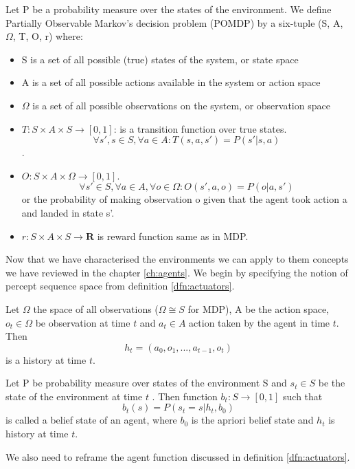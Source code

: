\begin{defn}
Let P be a probability measure over the states of the environment.	
We define Partially Observable Markov’s decision problem (POMDP) by a six-tuple (S, A, $\Omega$, T, O, r) where:
\begin{itemize}
	\item S is a set of all possible (true) states of the system, or state space
	\item A is a set of all possible actions available in the system or action space
	\item $\Omega$ is a set of all possible observations on the system, or observation space
	\item $T: S\times A\times S \rightarrow [0, 1]$: is a transition function over true states. 
	$$\forall s',s \in S, \forall a\in A: T(s, a,  s')=P(s'|s,a)$$.
	
	\item $ O: S\times A \times \Omega \rightarrow [0, 1]$. $$\forall s' \in S, \forall a\in A, \forall o\in\Omega: O(s', a,  o)=P(o|a, s')$$ or the probability of making observation o given that the agent took action a and landed in state s’. 
	\item $ r: S\times A\times S \rightarrow \boldsymbol{R} $ is reward function same as in MDP.
\end{itemize}
\end{defn}
Now that we have characterised the environments we can apply to them concepts we have reviewed in the chapter \ref{ch:agents}. We begin by specifying the notion of percept sequence space from definition \ref{dfn:actuators}.
\begin{defn}
	Let $ \Omega $ the space of all observations ($ \Omega \cong S $ for MDP), A be the action space, $ o_t \in \Omega $ be observation at time $ t $ and $ a_t \in A $ action taken by the agent in time $ t $. Then $$ h_t = (a_0, o_1,...,a_{t-1},o_t) $$ is a history at time $ t $.
\end{defn}
\begin{defn}
	Let P be probability measure over states of the environment S and $ s_t \in S $ be the state of the environment at time $ t $ . Then function $ b_t: S \rightarrow [0,1]$ such that $$ b_t(s) = P(s_t = s|h_t, b_0)$$ is called a belief state of an agent, where $ b_0 $ is the apriori belief state and $ h_t $ is history at time $ t $. 
\end{defn}
We also need to reframe the agent function discussed in definition \ref{dfn:actuators}.
